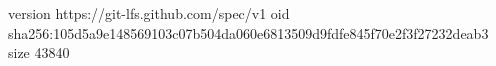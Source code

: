 version https://git-lfs.github.com/spec/v1
oid sha256:105d5a9e148569103c07b504da060e6813509d9fdfe845f70e2f3f27232deab3
size 43840
